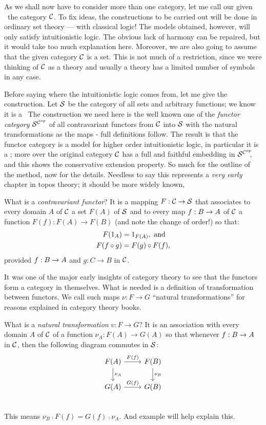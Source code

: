 As we shall now have to consider more than one category, let me call our given \ccc\ the category $\C$. To fix ideas, the constructions to be carried out will be done in ordinary set theory --- with classical logic! The models obtained, however, will only satisfy intuitionistic logic. The obvious lack of harmony can be repaired, but it would take too much explanation here. Moreover, we are also going to assume that the given category $\C$ is a set. This is not much of a restriction, since we were thinking of $\C$ as a theory and usually a theory has a limited number of symbols in any case.

Before saying where the intuitionistic logic comes from, let me give the construction. Let $\S$ be the category of all sets and arbitrary functions; we know it is a \ccc\  The construction we need here is the well known one of the {\it functor category} $\scop$ of all contravariant functors from $\C$ into $\S$ with the natural transformations as the maps - full definitions follow. The result is that the functor category is a model for higher order intuitionistic logic, in particular it is a \ccc; more over the original category $\C$ has a full and faithful embedding in $\scop\!\!$, and this shows the conservative extension property. So much for the outline of the method, now for the details. Needless to say this represents a {\it very early} chapter in topos theory; it should be more widely known,

What is a {\it contravariant functor}? It is a mapping $F: \C\to \S$ that associates to every domain $A$ of $\C$ a set $F(A)$ of $\S$ and to every map $f: \BA$ of $\C$ a function $F(f) : F(A) \to F(B)$ (and note the change of order!) so that:
\begin{align*}
F(\id_A) &= \id_{F(A)} , {\textrm{ and}}\\
F(f \comp g) &= F(g) \comp F(f),
\end{align*}
%
provided $f: \BA$ and $g: C \to B$ in $\C$.

It was one of the major early insights of category theory to see that the functors form
a category in themselves. What is needed is a definition of transformation between functors. We call such maps $\nu : F \to G$ ``natural transformations'' for reasons explained in category theory books.

What is a {\it natural transformation} $v : F\to G$? It is an association with every domain $A$ of $\C$ of a function $\nu_A: F(A)\to G(A)$ so that whenever $f : \BA$ in $\C$, then the following diagram commutes in $\S$:
\[
  \begin{tikzcd}
    F(A) \arrow{d}{\nu_A} \arrow{r}{F(f)}  & F(B) \arrow{d}{\nu_B} \\
    G(A)  \arrow{r}{G(f)} & G(B)\\
  \end{tikzcd}
\]
This means $\nu_B \comp F(f) = G(f) \comp \nu_A$. And example will help explain this.

